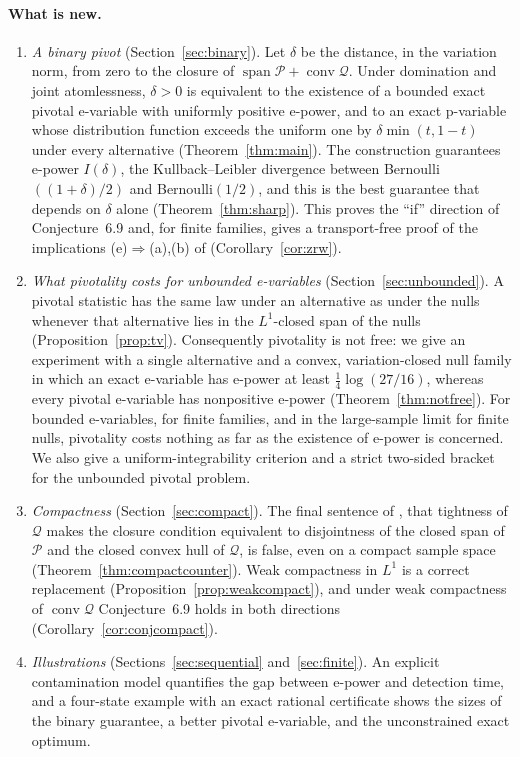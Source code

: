 \documentclass[11pt,a4paper]{article}
\theoremstyle{definition}
\theoremstyle{remark}
\newcommand{\PP}{\mathcal P}
\newcommand{\QQ}{\mathcal Q}
\newcommand{\conv}{\operatorname{conv}}
\newcommand{\spn}{\operatorname{span}}
\begin{document}
\paragraph{What is new.}
\begin{enumerate}[leftmargin=*]
\item \emph{A binary pivot} (Section~\ref{sec:binary}). Let \(\delta\) be the distance, in the variation norm, from zero to the closure of \(\spn\PP+\conv\QQ\). Under domination and joint atomlessness, \(\delta>0\) is equivalent to the existence of a bounded exact pivotal e-variable with uniformly positive e-power, and to an exact p-variable whose distribution function exceeds the uniform one by \(\delta\min(t,1-t)\) under every alternative (Theorem~\ref{thm:main}). The construction guarantees e-power \(I(\delta)\), the Kullback--Leibler divergence between Bernoulli\(((1+\delta)/2)\) and Bernoulli\((1/2)\), and this is the best guarantee that depends on \(\delta\) alone (Theorem~\ref{thm:sharp}). This proves the ``if'' direction of Conjecture~6.9 and, for finite families, gives a transport-free proof of the implications (e)\(\Rightarrow\)(a),(b) of \cite[Theorem~6.1]{ZRW} (Corollary~\ref{cor:zrw}).
\item \emph{What pivotality costs for unbounded e-variables} (Section~\ref{sec:unbounded}). A pivotal statistic has the same law under an alternative as under the nulls whenever that alternative lies in the \(L^1\)-closed span of the nulls (Proposition~\ref{prop:tv}). Consequently pivotality is not free: we give an experiment with a single alternative and a convex, variation-closed null family in which an exact e-variable has e-power at least \(\tfrac14\log(27/16)\), whereas every pivotal e-variable has nonpositive e-power (Theorem~\ref{thm:notfree}). For bounded e-variables, for finite families, and in the large-sample limit for finite nulls, pivotality costs nothing as far as the existence of e-power is concerned. We also give a uniform-integrability criterion and a strict two-sided bracket for the unbounded pivotal problem.
\item \emph{Compactness} (Section~\ref{sec:compact}). The final sentence of \cite[Theorem~6.8]{ZRW}, that tightness of \(\QQ\) makes the closure condition equivalent to disjointness of the closed span of \(\PP\) and the closed convex hull of \(\QQ\), is false, even on a compact sample space (Theorem~\ref{thm:compactcounter}). Weak compactness in \(L^1\) is a correct replacement (Proposition~\ref{prop:weakcompact}), and under weak compactness of \(\conv\QQ\) Conjecture~6.9 holds in both directions (Corollary~\ref{cor:conjcompact}).
\item \emph{Illustrations} (Sections~\ref{sec:sequential} and~\ref{sec:finite}). An explicit contamination model quantifies the gap between e-power and detection time, and a four-state example with an exact rational certificate shows the sizes of the binary guarantee, a better pivotal e-variable, and the unconstrained exact optimum.
\end{enumerate}
\end{document}

